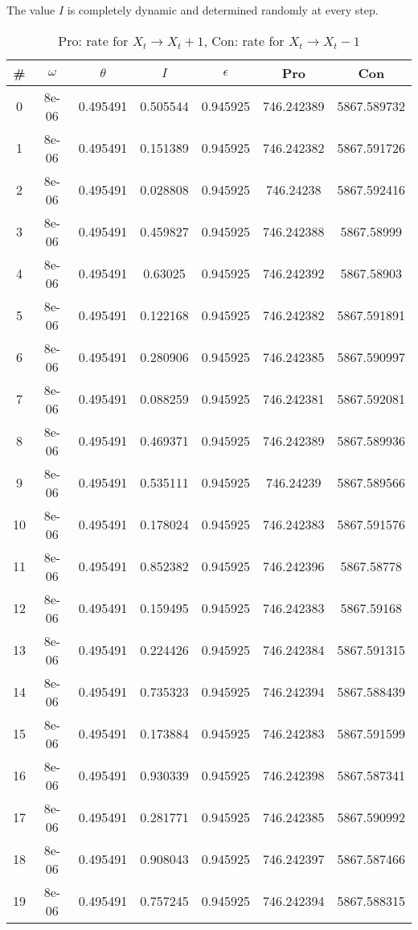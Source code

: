 The value $I$ is completely dynamic and determined randomly at every step.\begin{table}
\caption{Pro: rate for $X_t \rightarrow X_t + 1$, Con: rate for $X_t \rightarrow X_t - 1$}
\begin{tabular*}{\linewidth}{c|c|c|c|c|c|c}
\# & $\omega$ & $\theta$ & $I$ & $\epsilon$ & Pro & Con \\
\hline
0 & 8e-06 & 0.495491 & 0.505544 & 0.945925 & 746.242389 & 5867.589732\\
1 & 8e-06 & 0.495491 & 0.151389 & 0.945925 & 746.242382 & 5867.591726\\
2 & 8e-06 & 0.495491 & 0.028808 & 0.945925 & 746.24238 & 5867.592416\\
3 & 8e-06 & 0.495491 & 0.459827 & 0.945925 & 746.242388 & 5867.58999\\
4 & 8e-06 & 0.495491 & 0.63025 & 0.945925 & 746.242392 & 5867.58903\\
5 & 8e-06 & 0.495491 & 0.122168 & 0.945925 & 746.242382 & 5867.591891\\
6 & 8e-06 & 0.495491 & 0.280906 & 0.945925 & 746.242385 & 5867.590997\\
7 & 8e-06 & 0.495491 & 0.088259 & 0.945925 & 746.242381 & 5867.592081\\
8 & 8e-06 & 0.495491 & 0.469371 & 0.945925 & 746.242389 & 5867.589936\\
9 & 8e-06 & 0.495491 & 0.535111 & 0.945925 & 746.24239 & 5867.589566\\
10 & 8e-06 & 0.495491 & 0.178024 & 0.945925 & 746.242383 & 5867.591576\\
11 & 8e-06 & 0.495491 & 0.852382 & 0.945925 & 746.242396 & 5867.58778\\
12 & 8e-06 & 0.495491 & 0.159495 & 0.945925 & 746.242383 & 5867.59168\\
13 & 8e-06 & 0.495491 & 0.224426 & 0.945925 & 746.242384 & 5867.591315\\
14 & 8e-06 & 0.495491 & 0.735323 & 0.945925 & 746.242394 & 5867.588439\\
15 & 8e-06 & 0.495491 & 0.173884 & 0.945925 & 746.242383 & 5867.591599\\
16 & 8e-06 & 0.495491 & 0.930339 & 0.945925 & 746.242398 & 5867.587341\\
17 & 8e-06 & 0.495491 & 0.281771 & 0.945925 & 746.242385 & 5867.590992\\
18 & 8e-06 & 0.495491 & 0.908043 & 0.945925 & 746.242397 & 5867.587466\\
19 & 8e-06 & 0.495491 & 0.757245 & 0.945925 & 746.242394 & 5867.588315\\

\end{tabular*}
\end{table}

